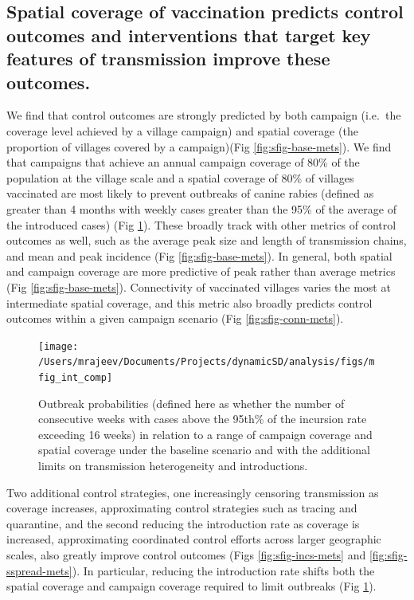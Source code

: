 \documentclass[
  oneside]{book}
\begin{document}
\hypertarget{spatial-coverage-of-vaccination-predicts-control-outcomes-and-interventions-that-target-key-features-of-transmission-improve-these-outcomes.}{%
\subsection{Spatial coverage of vaccination predicts control outcomes and interventions that target key features of transmission improve these outcomes.}\label{spatial-coverage-of-vaccination-predicts-control-outcomes-and-interventions-that-target-key-features-of-transmission-improve-these-outcomes.}}

We find that control outcomes are strongly predicted by both campaign (i.e.~the coverage level achieved by a village campaign) and spatial coverage (the proportion of villages covered by a campaign)(Fig \ref{fig:sfig-base-mets}). We find that campaigns that achieve an annual campaign coverage of 80\% of the population at the village scale and a spatial coverage of 80\% of villages vaccinated are most likely to prevent outbreaks of canine rabies (defined as greater than 4 months with weekly cases greater than the 95\% of the average of the introduced cases) (Fig \ref{fig:mfig-int-comp}). These broadly track with other metrics of control outcomes as well, such as the average peak size and length of transmission chains, and mean and peak incidence (Fig \ref{fig:sfig-base-mets}). In general, both spatial and campaign coverage are more predictive of peak rather than average metrics (Fig \ref{fig:sfig-base-mets}). Connectivity of vaccinated villages varies the most at intermediate spatial coverage, and this metric also broadly predicts control outcomes within a given campaign scenario (Fig \ref{fig:sfig-conn-mets}).

\begin{figure}
\texttt{[image: /Users/mrajeev/Documents/Projects/dynamicSD/analysis/figs/mfig\_int\_comp]} \caption[Outbreak probabilities across range of coverage and intervention scenarios.]{Outbreak probabilities (defined here as whether the number of consecutive weeks with cases above the 95th\% of the incursion rate exceeding 16 weeks) in relation to a range of campaign coverage and spatial coverage under the baseline scenario and with the additional limits on transmission heterogeneity and introductions.}\label{fig:mfig-int-comp}
\end{figure}



Two additional control strategies, one increasingly censoring transmission as coverage increases, approximating control strategies such as tracing and quarantine, and the second reducing the introduction rate as coverage is increased, approximating coordinated control efforts across larger geographic scales, also greatly improve control outcomes (Figs \ref{fig:sfig-incs-mets} and \ref{fig:sfig-sspread-mets}). In particular, reducing the introduction rate shifts both the spatial coverage and campaign coverage required to limit outbreaks (Fig \ref{fig:mfig-int-comp}).
\end{document}
